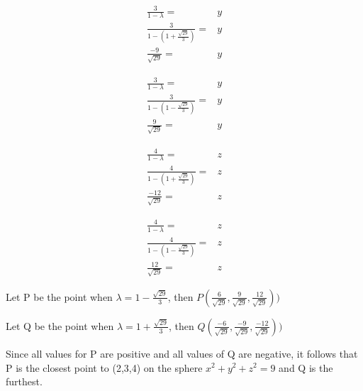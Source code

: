 \documentclass[11pt]{article}
\begin{document}
\begin{equation}
\begin{split}
\frac{3}{1 - \lambda} = & y\\
\frac{3}{1 - (1 + \frac{\sqrt{29}}{3})} = & y\\
\frac{-9}{\sqrt{29}} = & y
\end{split}
\end{equation}

\begin{equation}
\begin{split}
\frac{3}{1 - \lambda} = & y\\
\frac{3}{1 - (1 - \frac{\sqrt{29}}{3})} = & y\\
\frac{9}{\sqrt{29}} = & y
\end{split}
\end{equation}


\begin{equation}
\begin{split}
\frac{4}{1 - \lambda} = & z\\
\frac{4}{1 - (1 + \frac{\sqrt{29}}{3})} = & z\\
\frac{-12}{\sqrt{29}} = & z
\end{split}
\end{equation}

\begin{equation}
\begin{split}
\frac{4}{1 - \lambda} = & z\\
\frac{4}{1 - (1 - \frac{\sqrt{29}}{3})} = & z\\
\frac{12}{\sqrt{29}} = & z
\end{split}
\end{equation}

Let P be the point when \(\lambda = 1 - \frac{\sqrt{29}}{3}\), then  \(P(\frac{6}{\sqrt{29}}, \frac{9}{\sqrt{29}}, \frac{12}{\sqrt{29}}))\)

Let Q be the point when \(\lambda = 1 + \frac{\sqrt{29}}{3}\), then \(Q(\frac{-6}{\sqrt{29}}, \frac{-9}{\sqrt{29}}, \frac{-12}{\sqrt{29}}))\)

Since all values for P are positive and all values of Q are negative, it follows that P is the closest point to (2,3,4) on the sphere
\(x^2 + y^2 + z^2 = 9\) and Q is the furthest.
\end{document}
